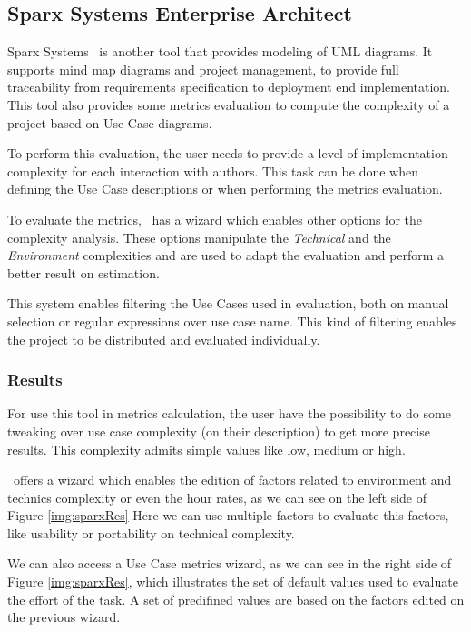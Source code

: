 \subsection{Sparx Systems Enterprise Architect}
Sparx Systems \entArch~is another tool that provides modeling of UML diagrams.
It supports mind map diagrams and project management, to provide full traceability from requirements specification to deployment end implementation.
This tool also provides some metrics evaluation to compute the complexity of a project based on Use Case diagrams. 

To perform this evaluation, the user needs to provide a level of implementation complexity for each interaction with authors. 
This task can be done when defining the Use Case descriptions or when performing the metrics evaluation.

To evaluate the metrics, \entArch~has a wizard which enables other options for the complexity analysis.
These options manipulate the \emph{Technical} and the \emph{Environment} complexities and are used to adapt the evaluation and perform a better result on estimation.

This system enables filtering the Use Cases used in evaluation, both on manual selection or regular expressions over use case name.
This kind of filtering enables the project to be distributed and evaluated individually.

\subsubsection{Results}
For use this tool in metrics calculation, the user have the possibility to do some tweaking over use case complexity (on their description) to get more precise results.
This complexity admits simple values like low, medium or high.

\entArch~offers a wizard which enables the edition of factors related to environment and technics complexity or even the hour rates, as we can see on the left side of Figure \ref{img:sparxRes}
Here we can use multiple factors to evaluate this factors, like usability or portability on technical complexity.

We can also access a Use Case metrics wizard, as we can see in the right side of Figure \ref{img:sparxRes}, which illustrates the set of default values used to evaluate the effort of the task.
A set of predifined values are based on the factors edited on the previous wizard.

